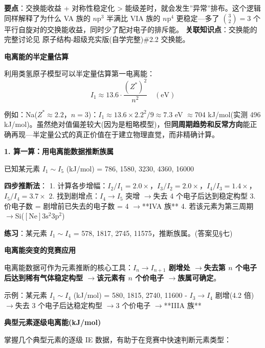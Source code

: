 \documentclass[a4paper,11pt]{ctexart}
\newcommand{\箭}{\ensuremath{\rightarrow}}
\newcommand{\左箭}{\ensuremath{\leftarrow}}
\newcommand{\上箭}{\ensuremath{\uparrow}}
\newcommand{\下箭}{\ensuremath{\downarrow}}
\newcommand{\衡}{\ensuremath{\rightleftharpoons}}
\newcommand{\双箭}{\ensuremath{\leftrightarrow}}
\newcommand{\约等于}{\ensuremath{\approx}}
\newcommand{\小于等于}{\ensuremath{\leq}}
\newcommand{\大于等于}{\ensuremath{\geq}}
\newcommand{\不等于}{\ensuremath{\neq}}
\newcommand{\西格马}{\ensuremath{\sigma}}
\newcommand{\派}{\ensuremath{\pi}}
\begin{document}
\textbf{要点}：交换能收益 + 对称性稳定化 \textgreater{} 能级差时，就会发生''异常''排布。这个逻辑同样解释了为什么 VA 族的 \(n\mathrm{p}^3\) 半满比 VIA 族的 \(n\mathrm{p}^4\) 更稳定---多了 \(\binom{3}{2}=3\) 个平行自旋对的交换能收益，同时少了配对电子的排斥能。
\textbf{关联知识点}：交换能的完整讨论见 原子结构-超级充实版(自学完整)\#2.2 交换能。

\textbf{电离能的半定量估算}

利用类氢原子模型可以半定量估算第一电离能：
\[I_1 \approx 13.6 \cdot \frac{(Z^*)^2}{n^2} \quad (\text{eV})\]

例如：Na(\(Z^*\approx2.2\)，\(n=3\))：\(I_1 \approx 13.6 \times 2.2^2/9 \approx 7.3\) eV \约等于 704 kJ/mol(实测 496 kJ/mol)。虽然绝对值偏差较大(因为是粗略模型)，但\textbf{同周期趋势和反常方向}能正确再现---半定量公式的真正价值在于建立物理直觉，而非精确计算。

\textbf{1. 算一算：用电离能数据推断族属}

已知某元素 \(I_1\sim I_5\) (kJ/mol) = 786, 1580, 3230, 4360, 16000

\textbf{四步推断法}：
1. 计算各步增幅：\(I_2/I_1=2.0\times\)，\(I_3/I_2=2.0\times\)，\(I_4/I_3=1.4\times\)，\(I_5/I_4=3.7\times\)
2. 找到剧增点：\(I_4\to I_5\) 突增 \箭 失去 4 个电子后达到稳定构型
3. 价电子数 = 剧增前已失去的电子数 = 4 \箭 **IVA 族**
4. 若该元素为第三周期 \箭 Si(\([\mathrm{Ne}]3\mathrm{s}^2 3\mathrm{p}^2\))

\textbf{练习}：某元素 \(I_1\sim I_4\) = 578, 1817, 2745, 11575，推断族属。(答案见§七)

\textbf{电离能突变的竞赛应用}

电离能数据可作为元素推断的核心工具：\textbf{\(I_n \to I_{n+1}\) 剧增处 \箭 失去第 \(n\) 个电子后达到稀有气体稳定构型 \箭 该元素有 \(n\) 个价电子 \箭 族属可确定}。

示例：某元素 \(I_1\sim I_4\) (kJ/mol) = 580, 1815, 2740, 11600
- \(I_3\to I_4\) 剧增(4.2 倍)\箭 失去 3 个电子后达稳定构型 \箭 3 个价电子 \箭 **IIIA 族**

\textbf{典型元素逐级电离能(kJ/mol)}

掌握几个典型元素的逐级 IE 数据，有助于在竞赛中快速判断元素类型：
\end{document}

